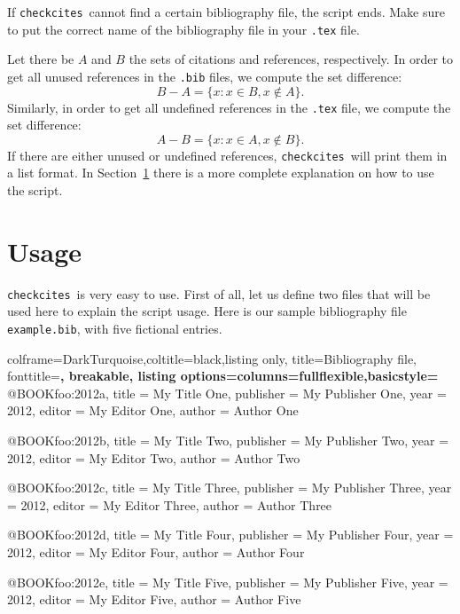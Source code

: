 \documentclass[12pt,a4paper]{article}
\newcommand{\checkcites}{\texttt{checkcites}}
\newenvironment{infoblock}[1]
  {\par\addvspace{\medskipamount}
   \begin{tcolorbox}[colframe=DarkTurquoise,coltitle=black,fonttitle=\bfseries,title=#1]}
  {\end{tcolorbox}\addvspace{\medskipamount}}
\begin{document}
\begin{infoblock}{Attention!}
If \checkcites\ cannot  find a certain bibliography  file, the script
ends. Make sure  to put the correct name of  the bibliography file in
your \verb|.tex| file.
\end{infoblock}

Let  there be  $A$  and $B$  the sets  of  citations and  references,
respectively.  In  order   to  get  all  unused   references  in  the
\verb|.bib| files, we compute the set difference:
\[
B - A = \{ x : x \in B, x \notin A \}.
\]
Similarly,  in  order   to  get  all  undefined   references  in  the
\verb|.tex| file, we compute the set difference:
\[
A - B = \{ x : x \in A, x \notin B \}.
\]
If there are either unused or undefined references, \checkcites\ will
print them  in a list  format. In Section~\ref{sec:usage} there  is a
more complete explanation on how to use the script.

\section{Usage}
\label{sec:usage}

\checkcites\ is  very easy to  use. First of  all, let us  define two
files that will be used here to explain the script usage. Here is our
sample  bibliography  file  \verb|example.bib|, with  five  fictional
entries.

\begin{tcblisting}{colframe=DarkTurquoise,coltitle=black,listing only,
                   title=Bibliography file, fonttitle=\bfseries, breakable,
                   listing options={columns=fullflexible,basicstyle=\ttfamily}}
@BOOK{foo:2012a,
  title = {My Title One},
  publisher = {My Publisher One},
  year = {2012},
  editor = {My Editor One},
  author = {Author One}
}

@BOOK{foo:2012b,
  title = {My Title Two},
  publisher = {My Publisher Two},
  year = {2012},
  editor = {My Editor Two},
  author = {Author Two}
}

@BOOK{foo:2012c,
  title = {My Title Three},
  publisher = {My Publisher Three},
  year = {2012},
  editor = {My Editor Three},
  author = {Author Three}
}

@BOOK{foo:2012d,
  title = {My Title Four},
  publisher = {My Publisher Four},
  year = {2012},
  editor = {My Editor Four},
  author = {Author Four}
}

@BOOK{foo:2012e,
  title = {My Title Five},
  publisher = {My Publisher Five},
  year = {2012},
  editor = {My Editor Five},
  author = {Author Five}
}
\end{tcblisting}
\end{document}

